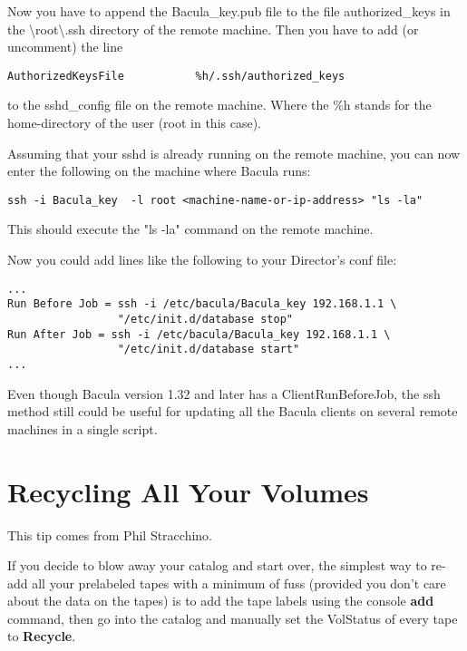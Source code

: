 Now you have to append the Bacula\_key.pub file to the file authorized\_keys
in the \textbackslash{}root\textbackslash{}.ssh directory of the remote
machine. Then you have to add (or uncomment) the line 

\footnotesize
\begin{verbatim}
AuthorizedKeysFile           %h/.ssh/authorized_keys
\end{verbatim}
\normalsize

to the sshd\_config file on the remote machine. Where the \%h stands for the
home-directory of the user (root in this case). 

Assuming that your sshd is already running on the remote machine, you can now
enter the following on the machine where Bacula runs: 

\footnotesize
\begin{verbatim}
ssh -i Bacula_key  -l root <machine-name-or-ip-address> "ls -la"
\end{verbatim}
\normalsize

This should execute the "ls -la" command on the remote machine. 

Now you could add lines like the following to your Director's conf file: 

\footnotesize
\begin{verbatim}
...
Run Before Job = ssh -i /etc/bacula/Bacula_key 192.168.1.1 \
                 "/etc/init.d/database stop"
Run After Job = ssh -i /etc/bacula/Bacula_key 192.168.1.1 \
                 "/etc/init.d/database start"
...
\end{verbatim}
\normalsize

Even though Bacula version 1.32 and later has a ClientRunBeforeJob, the ssh method still
could be useful for updating all the Bacula clients on several remote machines
in a single script. 

\section{Recycling All Your Volumes}
\label{recycle}

This tip comes from Phil Stracchino. 

If you decide to blow away your catalog and start over, the simplest way to
re-add all your prelabeled tapes with a minimum of fuss (provided you don't
care about the data on the tapes) is to add the tape labels using the console
{\bf add} command, then go into the catalog and manually set the VolStatus of
every tape to {\bf Recycle}. 

